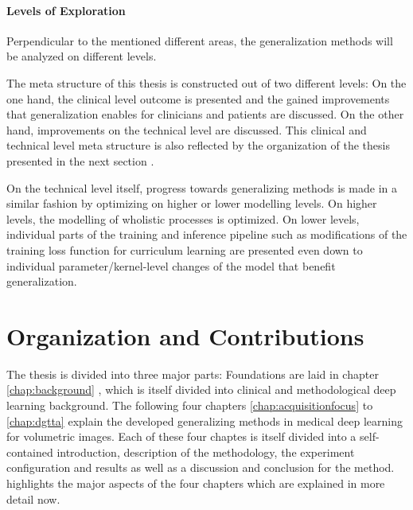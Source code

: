         \paragraph{Levels of Exploration}
            Perpendicular to the mentioned different areas, the generalization methods will be analyzed on different levels.

            The meta structure of this thesis is constructed out of two different levels: On the one hand, the clinical level outcome is presented and the gained improvements that generalization enables for clinicians and patients are discussed.
            On the other hand, improvements on the technical level are discussed.
            This clinical and technical level meta structure is also reflected by the organization of the thesis presented in the next section .

            On the technical level itself, progress towards generalizing methods is made in a similar fashion by optimizing on higher or lower modelling levels.
            On higher levels, the modelling of wholistic processes is optimized. On lower levels, individual parts of the training and inference pipeline such as modifications of the training loss function for curriculum learning are presented even down to individual parameter/kernel-level changes of the model that benefit generalization.


        \section{Organization and Contributions}  %
            \label{sec:organization}
            The thesis is divided into three major parts:
            Foundations are laid in chapter \ref{chap:background} , which is itself divided into clinical and methodological deep learning background.
            The following four chapters \ref{chap:acquisitionfocus} to  \ref{chap:dgtta} explain the developed generalizing methods in medical deep learning for volumetric images. Each of these four chaptes is itself divided into a self-contained introduction, description of the methodology, the experiment configuration and results as well as a discussion and conclusion for the method. %
             highlights the major aspects of the four chapters which are explained in more detail now.


